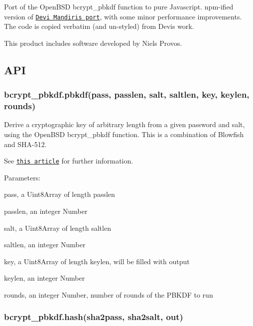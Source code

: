 Port of the Open\+B\+SD {\ttfamily bcrypt\+\_\+pbkdf} function to pure Javascript. {\ttfamily npm}-\/ified version of \href{https://github.com/devi/tmp/blob/master/js/bcrypt_pbkdf.js}{\tt Devi Mandiri\textquotesingle{}s port}, with some minor performance improvements. The code is copied verbatim (and un-\/styled) from Devi\textquotesingle{}s work.

This product includes software developed by Niels Provos.

\subsection*{A\+PI}

\subsubsection*{{\ttfamily bcrypt\+\_\+pbkdf.\+pbkdf(pass, passlen, salt, saltlen, key, keylen, rounds)}}

Derive a cryptographic key of arbitrary length from a given password and salt, using the Open\+B\+SD {\ttfamily bcrypt\+\_\+pbkdf} function. This is a combination of Blowfish and S\+H\+A-\/512.

See \href{http://www.tedunangst.com/flak/post/bcrypt-pbkdf}{\tt this article} for further information.

Parameters\+:


\begin{DoxyItemize}
\item {\ttfamily pass}, a Uint8\+Array of length {\ttfamily passlen}
\item {\ttfamily passlen}, an integer Number
\item {\ttfamily salt}, a Uint8\+Array of length {\ttfamily saltlen}
\item {\ttfamily saltlen}, an integer Number
\item {\ttfamily key}, a Uint8\+Array of length {\ttfamily keylen}, will be filled with output
\item {\ttfamily keylen}, an integer Number
\item {\ttfamily rounds}, an integer Number, number of rounds of the P\+B\+K\+DF to run
\end{DoxyItemize}

\subsubsection*{{\ttfamily bcrypt\+\_\+pbkdf.\+hash(sha2pass, sha2salt, out)}}

